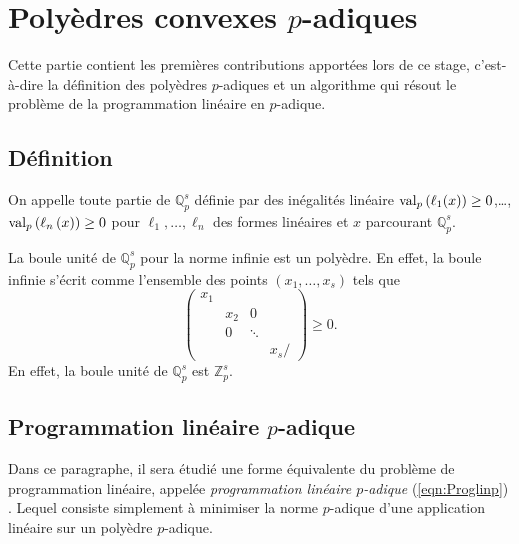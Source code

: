 \section{Polyèdres convexes \texorpdfstring{$p$}{p}-adiques}
\label{sec:polyedre} 
Cette partie contient les premières contributions apportées lors de ce stage, c'est-à-dire la définition des polyèdres $p$-adiques et un algorithme qui résout le problème de la programmation linéaire en $p$-adique.
\subsection{Définition}

\begin{definition}
	On appelle  toute partie de $\mathbb{Q}_{p}^s$ définie par des inégalités linéaire $\text{val}_p\left( \ell_1(x)\right)\ge 0$,\ldots, $ \text{val}_p\left( \ell_n\left( x \right) \right)\ge 0$ pour $ \ell_1,\ldots, \ell_n $ des formes linéaires et $x$ parcourant $\mathbb{Q}_{p} ^s$.


\end{definition}

\begin{ex}
	La boule unité de $\mathbb{Q}_{p}^s$ pour la norme infinie est un polyèdre. En effet, la boule infinie s'écrit comme l'ensemble des points $\left( x_1,\ldots,x_s \right)$ tels que $$
	\begin{pmatrix} x_1 &  & & \\
		  & x_2 &0 &  \\
		&  0& \ddots & \\
		&  & & x_s/
	\end{pmatrix} \ge 0.$$ En effet, la boule unité de $\mathbb{Q}_{p} ^s$ est $\mathbb{Z}_p^s$. %

\end{ex}

\subsection{Programmation linéaire \texorpdfstring{$p$-adique}{p-adique} } 
\label{sectionalgo} 
Dans ce paragraphe, il sera étudié une forme équivalente du problème de programmation linéaire, appelée \textit{programmation linéaire $p$-adique} (\ref{eqn:Proglinp}) . Lequel consiste simplement à minimiser la norme $p$-adique d'une application linéaire sur un polyèdre $p$-adique. 


